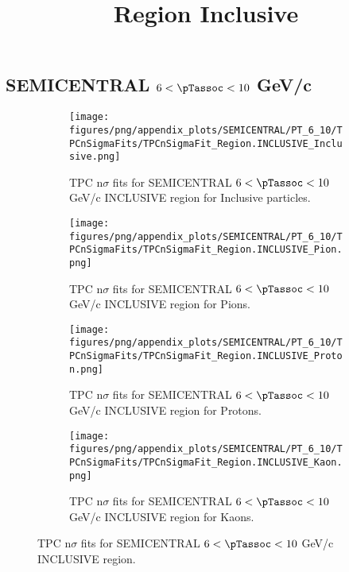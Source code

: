     
            \subsection*{SEMICENTRAL $6 < \pTassoc < 10$ GeV/c}
            \begin{figure}[H]
                \title{Region Inclusive}
                \begin{subfigure}[b]{0.5\textwidth}
                    \centering
                    \texttt{[image: figures/png/appendix\_plots/SEMICENTRAL/PT\_6\_10/TPCnSigmaFits/TPCnSigmaFit\_Region.INCLUSIVE\_Inclusive.png]}
                    \caption{TPC n$\sigma$ fits for SEMICENTRAL $6 < \pTassoc < 10$ GeV/c INCLUSIVE region for Inclusive particles.}
                    \label{fig:appendix_SEMICENTRAL_$6 < \pTassoc < 10$ GeV/c_INCLUSIVE_Inclusive}
                \end{subfigure}
                \begin{subfigure}[b]{0.5\textwidth}
                    \centering
                    \texttt{[image: figures/png/appendix\_plots/SEMICENTRAL/PT\_6\_10/TPCnSigmaFits/TPCnSigmaFit\_Region.INCLUSIVE\_Pion.png]}
                    \caption{TPC n$\sigma$ fits for SEMICENTRAL $6 < \pTassoc < 10$ GeV/c INCLUSIVE region for Pions.}
                    \label{fig:appendix_SEMICENTRAL_$6 < \pTassoc < 10$ GeV/c_INCLUSIVE_Pion}
                \end{subfigure}
                \begin{subfigure}[b]{0.5\textwidth}
                    \centering
                    \texttt{[image: figures/png/appendix\_plots/SEMICENTRAL/PT\_6\_10/TPCnSigmaFits/TPCnSigmaFit\_Region.INCLUSIVE\_Proton.png]}
                    \caption{TPC n$\sigma$ fits for SEMICENTRAL $6 < \pTassoc < 10$ GeV/c INCLUSIVE region for Protons.}
                    \label{fig:appendix_SEMICENTRAL_$6 < \pTassoc < 10$ GeV/c_INCLUSIVE_Proton}
                \end{subfigure}
                \begin{subfigure}[b]{0.5\textwidth}
                    \centering
                    \texttt{[image: figures/png/appendix\_plots/SEMICENTRAL/PT\_6\_10/TPCnSigmaFits/TPCnSigmaFit\_Region.INCLUSIVE\_Kaon.png]}
                    \caption{TPC n$\sigma$ fits for SEMICENTRAL $6 < \pTassoc < 10$ GeV/c INCLUSIVE region for Kaons.}
                    \label{fig:appendix_SEMICENTRAL_$6 < \pTassoc < 10$ GeV/c_INCLUSIVE_Kaon}
                \end{subfigure}
                \caption{TPC n$\sigma$ fits for SEMICENTRAL $6 < \pTassoc < 10$ GeV/c INCLUSIVE region.}
                \label{fig:appendix_SEMICENTRAL_$6 < \pTassoc < 10$ GeV/c_INCLUSIVE}
            \end{figure}
